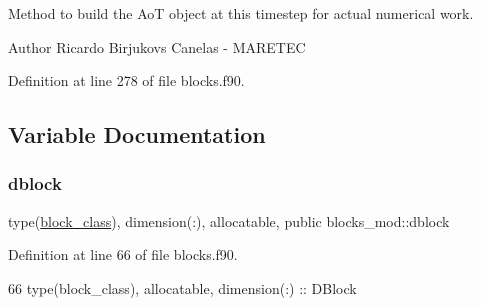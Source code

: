 Method to build the AoT object at this timestep for actual numerical work. 

\begin{DoxyAuthor}{Author}
Ricardo Birjukovs Canelas -\/ M\+A\+R\+E\+T\+EC 
\end{DoxyAuthor}


Definition at line 278 of file blocks.\+f90.




\subsection{Variable Documentation}
\mbox{\label{namespaceblocks__mod_ac8ad6e3cf7a812f95dadb592336aca50}} 
\subsubsection{\texorpdfstring{dblock}{dblock}}
{\footnotesize\ttfamily type(\mbox{\hyperlink{structblocks__mod_1_1block__class}{block\+\_\+class}}), dimension(\+:), allocatable, public blocks\+\_\+mod\+::dblock}



Definition at line 66 of file blocks.\+f90.


\begin{DoxyCode}
66     \textcolor{keywordtype}{type}(block\_class), \textcolor{keywordtype}{allocatable}, \textcolor{keywordtype}{dimension(:)} :: DBlock
\end{DoxyCode}
